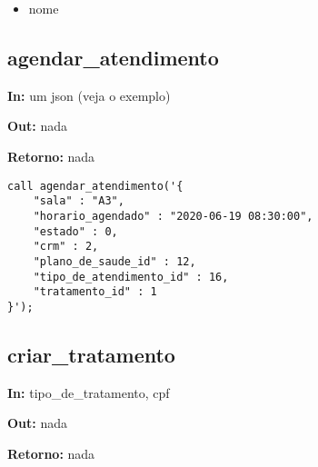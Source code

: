 \begin{itemize}
	\item nome
\end{itemize}

\subsection{agendar\_atendimento}

\textbf{In:} um json (veja o exemplo)

\textbf{Out:} nada

\textbf{Retorno:} nada

\begin{verbatim}
call agendar_atendimento('{
	"sala" : "A3",
	"horario_agendado" : "2020-06-19 08:30:00",
	"estado" : 0,
	"crm" : 2,
	"plano_de_saude_id" : 12,
	"tipo_de_atendimento_id" : 16,
	"tratamento_id" : 1
}');
\end{verbatim}

\subsection{criar\_tratamento}

\textbf{In:} tipo\_de\_tratamento, cpf

\textbf{Out:} nada

\textbf{Retorno:} nada
